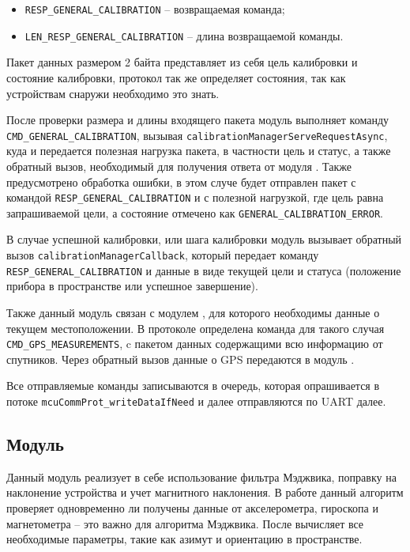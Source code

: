 \begin{itemize}
    \item \lstinline{RESP_GENERAL_CALIBRATION} -- возвращаемая команда;
    \item \lstinline{LEN_RESP_GENERAL_CALIBRATION} -- длина возвращаемой команды.
\end{itemize}

Пакет данных размером 2 байта представляет из себя цель калибровки и состояние калибровки, протокол так же определяет состояния, так как устройствам снаружи необходимо это знать.

После проверки размера и длины входящего пакета модуль выполняет команду \lstinline{CMD_GENERAL_CALIBRATION}, вызывая \lstinline{calibrationManagerServeRequestAsync},
куда и передается полезная нагрузка пакета, в частности цель и статус, а также обратный вызов, необходимый для получения ответа от модуля \moduleCalibControl.
Также предусмотрено обработка ошибки, в этом случе будет отправлен пакет с командой
\lstinline{RESP_GENERAL_CALIBRATION} и с полезной нагрузкой, где цель равна запрашиваемой цели, а состояние отмечено как \lstinline{GENERAL_CALIBRATION_ERROR}.

В случае успешной калибровки, или шага калибровки модуль \moduleCalibControl вызывает обратный вызов \lstinline{calibrationManagerCallback}, который передает команду 
\lstinline{RESP_GENERAL_CALIBRATION} и данные в виде текущей цели и статуса (положение прибора в пространстве или успешное завершение).

Также данный модуль связан с модулем \moduleOrientationAzimuth , для которого необходимы данные о текущем местоположении. В протоколе определена команда для такого случая
\lstinline{CMD_GPS_MEASUREMENTS}, c пакетом данных содержащими всю информацию от спутников. Через обратный вызов данные о GPS передаются в модуль \moduleOrientationAzimuth .

Все отправляемые команды записываются в очередь, которая опрашивается в потоке \lstinline{mcuCommProt_writeDataIfNeed} и далее отправляются по UART далее.

\subsection{Модуль \moduleOrientationAzimuth}

Данный модуль реализует в себе использование фильтра Мэджвика, поправку на наклонение устройства и учет магнитного наклонения.
В работе данный алгоритм проверяет одновременно ли получены данные от акселерометра, гироскопа и магнетометра -- это важно для алгоритма Мэджвика.
После вычисляет все необходимые параметры, такие как азимут и ориентацию в пространстве. 

